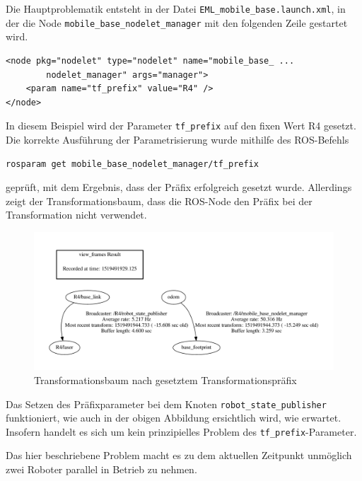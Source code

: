 Die Hauptproblematik entsteht in der Datei \lstinline{EML_mobile_base.launch.xml}{}, in der die Node \lstinline{mobile_base_nodelet_manager}{} mit den folgenden Zeile gestartet wird.
\begin{lstlisting}[caption={Ausschnitt aus EML\_mobile\_base.launch.xml},captionpos=b]
<node pkg="nodelet" type="nodelet" name="mobile_base_ ...
		nodelet_manager" args="manager">
	<param name="tf_prefix" value="R4" />
</node>
\end{lstlisting}
In diesem Beispiel wird der Parameter \lstinline{tf_prefix}{} auf den fixen Wert R4 gesetzt. Die korrekte Ausführung der Parametrisierung wurde mithilfe des ROS-Befehls
\begin{lstlisting}
rosparam get mobile_base_nodelet_manager/tf_prefix
\end{lstlisting}
geprüft, mit dem Ergebnis, dass der Präfix erfolgreich gesetzt wurde. Allerdings zeigt der Transformationsbaum, dass die ROS-Node den Präfix bei der Transformation nicht verwendet.
\begin{figure}[!ht]
\centering
\includegraphics[width=0.8\linewidth, trim={1cm, 1cm, 1cm, 5cm}, clip]{img/TF_Tree_TF_Prefix.pdf}
\caption{Transformationsbaum nach gesetztem Transformationspräfix}
\end{figure}
Das Setzen des Präfixparameter bei dem Knoten \lstinline{robot_state_publisher}{} funktioniert, wie auch in der obigen Abbildung ersichtlich wird, wie erwartet. Insofern handelt es sich um kein prinzipielles Problem des \lstinline{tf_prefix}{}-Parameter. 

Das hier beschriebene Problem macht es zu dem aktuellen Zeitpunkt unmöglich zwei Roboter parallel in Betrieb zu nehmen.